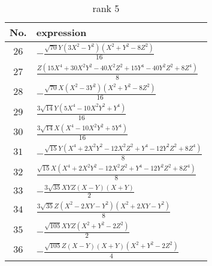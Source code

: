 \documentclass[fleqn,8pt,landscape]{jsarticle}
\begin{document}
\begin{table}[ht!]
\begin{center}
\caption{rank 5}
\renewcommand{\arraystretch}{1.3}
\begin{tabular}{cl} \hline \hline
No. & expression \\ \hline
$ 26 $ & $ - \frac{\sqrt{70} Y \left(3 X^{2} - Y^{2}\right) \left(X^{2} + Y^{2} - 8 Z^{2}\right)}{16} $ \\
$ 27 $ & $ \frac{Z \left(15 X^{4} + 30 X^{2} Y^{2} - 40 X^{2} Z^{2} + 15 Y^{4} - 40 Y^{2} Z^{2} + 8 Z^{4}\right)}{8} $ \\
$ 28 $ & $ - \frac{\sqrt{70} X \left(X^{2} - 3 Y^{2}\right) \left(X^{2} + Y^{2} - 8 Z^{2}\right)}{16} $ \\
$ 29 $ & $ \frac{3 \sqrt{14} Y \left(5 X^{4} - 10 X^{2} Y^{2} + Y^{4}\right)}{16} $ \\
$ 30 $ & $ \frac{3 \sqrt{14} X \left(X^{4} - 10 X^{2} Y^{2} + 5 Y^{4}\right)}{16} $ \\
$ 31 $ & $ - \frac{\sqrt{15} Y \left(X^{4} + 2 X^{2} Y^{2} - 12 X^{2} Z^{2} + Y^{4} - 12 Y^{2} Z^{2} + 8 Z^{4}\right)}{8} $ \\
$ 32 $ & $ \frac{\sqrt{15} X \left(X^{4} + 2 X^{2} Y^{2} - 12 X^{2} Z^{2} + Y^{4} - 12 Y^{2} Z^{2} + 8 Z^{4}\right)}{8} $ \\
$ 33 $ & $ - \frac{3 \sqrt{35} X Y Z \left(X - Y\right) \left(X + Y\right)}{2} $ \\
$ 34 $ & $ \frac{3 \sqrt{35} Z \left(X^{2} - 2 X Y - Y^{2}\right) \left(X^{2} + 2 X Y - Y^{2}\right)}{8} $ \\
$ 35 $ & $ - \frac{\sqrt{105} X Y Z \left(X^{2} + Y^{2} - 2 Z^{2}\right)}{2} $ \\
$ 36 $ & $ - \frac{\sqrt{105} Z \left(X - Y\right) \left(X + Y\right) \left(X^{2} + Y^{2} - 2 Z^{2}\right)}{4} $ \\
 \hline \hline
\end{tabular}
\end{center}
\end{table}
\end{document}
